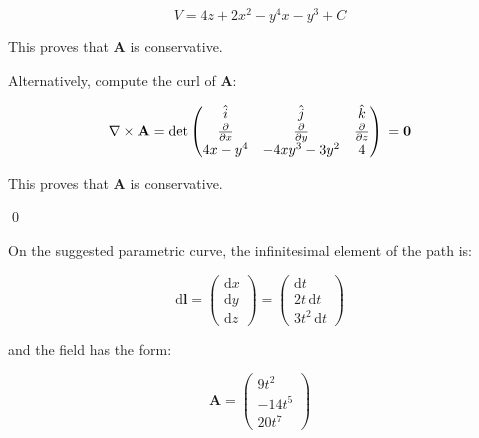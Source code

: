 \documentclass[12pt]{article}
\begin{document}
\begin{equation}
    V = 4z + 2x^{2} - y^{4}x - y^{3} + C
\end{equation}

This proves that $\mathbf{A}$ is conservative.

\begin{correction}
    Alternatively, compute the curl of $\mathbf{A}$:

    \begin{equation}
        \nabla \times \mathbf{A}
        =
        \det
        \begin{pmatrix}
            \hat{i}                     & \hat{j}                     & \hat{k}                     \\
            \frac{\partial}{\partial x} & \frac{\partial}{\partial y} & \frac{\partial}{\partial z} \\
            4x - y^{4}                  & -4xy^{3} - 3y^{2}           & 4
        \end{pmatrix} \\
        =
        \mathbf{0}
    \end{equation}

    This proves that $\mathbf{A}$ is conservative.
\end{correction}
\qed



On the suggested parametric curve, the infinitesimal element of the path is:

\begin{equation}
    \mathrm{d}\mathbf{l}
    =
    \begin{pmatrix}
        \mathrm{d}x \\
        \mathrm{d}y \\
        \mathrm{d}z
    \end{pmatrix}
    =
    \begin{pmatrix}
        \mathrm{d}t       \\
        2t \, \mathrm{d}t \\
        3t^{2} \, \mathrm{d}t
    \end{pmatrix}
\end{equation}

and the field has the form:

\begin{equation}
    \mathbf{A}
    =
    \begin{pmatrix}
        9t^{2}   \\
        -14t^{5} \\
        20t^{7}
    \end{pmatrix}
\end{equation}
\end{document}
